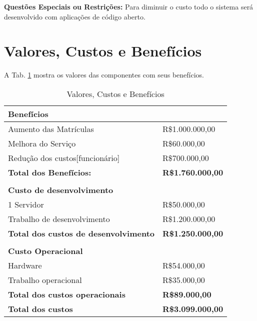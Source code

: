       \textbf{Questões Especiais ou Restrições:}
      Para diminuir o custo todo o sistema será desenvolvido com aplicações de código aberto.

    \section{Valores, Custos e Benefícios}
 
  A Tab. \ref{VaCuBe} mostra os valores das componentes com seus benefícios.
    \begin{table}[h]
    \centering
    \begin{tabular}{|l|l|}
    \hline
	  \textbf{Benefícios}                          &                          \\ \hline
	  Aumento das Matrículas                       & R\$1.000.000,00          \\ \hline
	  Melhora do Serviço                           & R\$60.000,00             \\ \hline
	  Redução dos custos{[}funcionário{]}          & R\$700.000,00             \\ \hline
	  \textbf{Total dos Benefícios:}               & \textbf{R\$1.760.000,00} \\ \hline
						      &                          \\ \hline
	  \textbf{Custo de desenvolvimento}            &                          \\ \hline
	  1 Servidor                                   & R\$50.000,00             \\ \hline
	  Trabalho de desenvolvimento                  & R\$1.200.000,00          \\ \hline
	  \textbf{Total dos custos de desenvolvimento} & \textbf{R\$1.250.000,00} \\ \hline
						      &                          \\ \hline
	  \textbf{Custo Operacional}                   &                          \\ \hline
	  Hardware                                     & R\$54.000,00             \\ \hline
	  Trabalho operacional                         & R\$35.000,00             \\ \hline
	  \textbf{Total dos custos operacionais}       & \textbf{R\$89.000,00}   \\ \hline
	  \textbf{Total dos custos}       & \textbf{R\$3.099.000,00}  \\ \hline

    \end{tabular}
    \caption{Valores, Custos e Benefícios} \label{VaCuBe}
\end{table}


